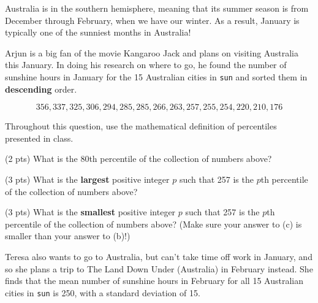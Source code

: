 \begin{prob}[(10 pts)]

Australia is in the southern hemisphere, meaning that its summer season is from December through February, when we have our winter. As a result, January is typically one of the sunniest months in Australia!

Arjun is a big fan of the movie Kangaroo Jack and plans on visiting Australia this January. In doing his research on where to go, he found the number of sunshine hours in January for the 15 Australian cities in \texttt{sun} and sorted them in \textbf{descending} order.

$$356, 337, 325, 306, 294, 285, 285, 266, 263, 257, 255, 254, 220, 210, 176$$

Throughout this question, use the mathematical definition of percentiles presented in class.

\begin{subprobset}

\begin{subprob}(2 pts) What is the 80th percentile of the collection of numbers above?


\end{subprob}

\begin{subprob}(3 pts) What is the \textbf{largest} positive integer $p$ such that 257 is the $p$th percentile of the collection of numbers above?

\inlineresponsebox[2in]{}{}

\end{subprob}

\begin{subprob}(3 pts) What is the \textbf{smallest} positive integer $p$ such that 257 is the $p$th percentile of the collection of numbers above? (Make sure your answer to (c) is smaller than your answer to (b)!)

\inlineresponsebox[2in]{}{}
\end{subprob}

\end{subprobset}

Teresa also wants to go to Australia, but can't take time off work in January, and so she plans a trip to The Land Down Under (Australia) in February instead. She finds that the mean number of sunshine hours in February for all 15 Australian cities in \texttt{sun} is 250, with a standard deviation of 15.


\end{prob}
